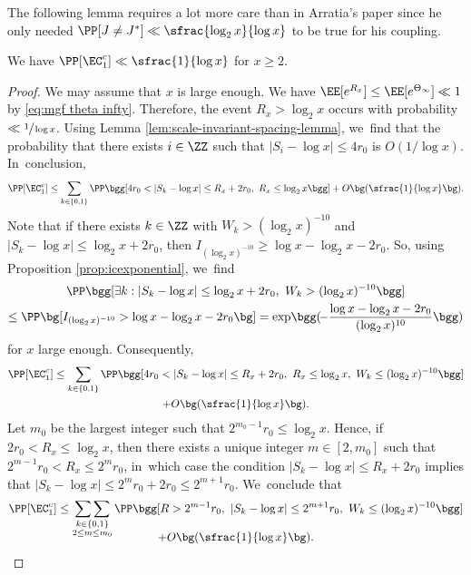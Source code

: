 The following lemma requires a lot more care than in Arratia's paper \cite{Arratia02} since he only needed $\PP[J \ne J^*] \ll \sfrac{\log_2 x}{\log x}$ to be true for his coupling.

\begin{lem}
\label{lem:prob e1c}
We have $\PP[\EC_1^c] \ll \sfrac{1}{\log x}$ for $x\ge2$.
\end{lem}

\begin{proof} We may assume that $x$ is large enough.
We have $\EE[e^{R_x}]\le \EE[e^{\Theta_\infty}] \ll 1$ by \eqref{eq:mgf theta infty}. Therefore, the event $R_x > \log_2 x$ occurs with probability $\ll\sfrac{1}{\log x}$. Using Lemma \ref{lem:scale-invariant-spacing-lemma}, we~find that the probability that there exists $i\in\ZZ$ such that $|S_i-\log x|\le 4r_0$ is $O(1/\log x)$. In~conclusion,
\[
\PP[\EC_1^c] \le \sum_{k\in\{0,1\}} \PP\bgg[4r_0<|S_k-\log x|\le R_x+2r_0,\ R_x\le \log_2x \bgg] +O\bg(\sfrac{1}{\log x}\bg).
\]
\pagebreak[2]
Note that if there exists $k \in \ZZ$ with $W_k>(\log_2x)^{-10}$ and $|S_k-\log x|\le \log_2x + 2r_0$, then $I_{(\log_2x)^{-10}}\ge \log x-\log_2x-2r_0$. So, using Proposition \ref{prop:icexponential}, we~find
\begin{multline*}
\PP\bgg[\exists k: |S_k-\log x|\le \log_2x+2r_0,\ W_k>(\log_2x)^{-10} \bgg] \\
\le \PP\bg[I_{(\log_2 x)^{-10}} > \log x-\log_2x-2r_0\bg]
= \exp\!\bgg(\!-\frac{\log x-\log_2x-2r_0}{(\log_2x)^{10}}\bgg)
\end{multline*}
for $x$ large enough. Consequently,
\begin{multline*}
\PP[\EC_1^c] \le \sum_{k\in\{0,1\}} \PP\bgg[4r_0<|S_k-\log x|\le R_x+2r_0,\ R_x\le \log_2x,\ W_k\le(\log_2x)^{-10} \bgg] \\
+ O\bg(\sfrac{1}{\log x}\bg).
\end{multline*}
Let $m_0$ be the largest integer such that $2^{m_0-1}r_0\le \log_2x$. Hence, if $2r_0<R_x\le\log_2x$, then there exists a unique integer $m\!\in\![2,m_0]$ such that $2^{m-1}r_0\!<\!R_x\!\le\! 2^mr_0$, in~which case the condition $|S_k-\log x|\!\le\! R_x+2r_0$ implies that $|S_k-\log x|\!\le\! 2^mr_0 +2r_0\!\le\! 2^{m+1}r_0$. We~conclude that
\begin{multline*}
\PP[\EC_1^c]
\le \mathop{\sum\sum}_{\substack{k\in\{0,1\} \\ 2\le m\le m_0} }
\PP\bgg[R> 2^{m-1}r_0,\ |S_k-\log x|\le 2^{m+1}r_0,\ W_k \le (\log_2 x)^{-10} \bgg] \\[-10pt]
+O\bg(\sfrac{1}{\log x}\bg).

\end{multline*}
\end{proof}
